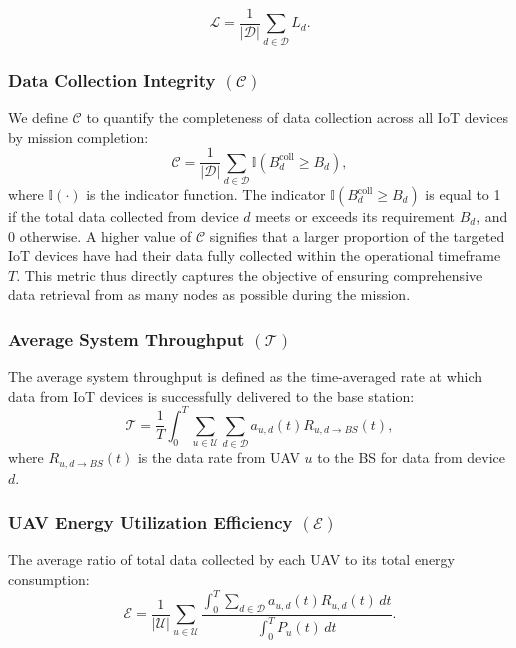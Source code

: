 \documentclass[10pt,conference,letterpaper]{IEEEtran}
\begin{document}
\begin{equation}
\mathcal{L} = \frac{1}{|\mathcal{D}|} \sum_{d \in \mathcal{D}} L_d.
\label{eq:avg_latency_terse}
\end{equation}

\subsubsection{Data Collection Integrity $(\mathcal{C})$}
We define $\mathcal{C}$ to quantify the completeness of data collection across all IoT devices by mission completion:
\begin{equation}
\mathcal{C} = \frac{1}{|\mathcal{D}|} \sum_{d \in \mathcal{D}} \mathbb{I}\left( B_d^{\text{coll}} \geq B_d \right),
\label{eq:c_comp_definition}
\end{equation}
where $\mathbb{I}(\cdot)$ is the indicator function. The indicator $\mathbb{I}\left( B_d^{\text{coll}}\geq B_d \right)$ is equal to 1 if the total data collected from device $d$ meets or exceeds its requirement $B_d$, and 0 otherwise. A higher value of $\mathcal{C}$ signifies that a larger proportion of the targeted IoT devices have had their data fully collected within the operational timeframe $T$. This metric thus directly captures the objective of ensuring comprehensive data retrieval from as many nodes as possible during the mission.



\subsubsection{Average System Throughput $(\mathcal{T})$}

The average system throughput is defined as the time-averaged rate at which data from IoT devices is successfully delivered to the base station:
\begin{equation}
\mathcal{T}= \frac{1}{T}\int_0^T\sum_{u \in \mathcal{U}} \sum_{d \in \mathcal{D}} a_{u,d}(t) R_{u,d \rightarrow BS}(t),
\end{equation}
where $R_{u,d \rightarrow BS}(t)$ is the data rate from UAV $u$ to the BS for data from device $d$.

\subsubsection{UAV Energy Utilization Efficiency $(\mathcal{E})$}

The average ratio of total data collected by each UAV to its total energy consumption:
\begin{equation}
\mathcal{E} = \frac{1}{|\mathcal{U}|} \sum_{u \in \mathcal{U}} \frac{\int_{0}^{T} \sum_{d \in \mathcal{D}} a_{u,d}(t) R_{u,d}(t) \, dt}{\int_{0}^{T} P_{u}(t) \, dt}.
\end{equation}
\end{document}
